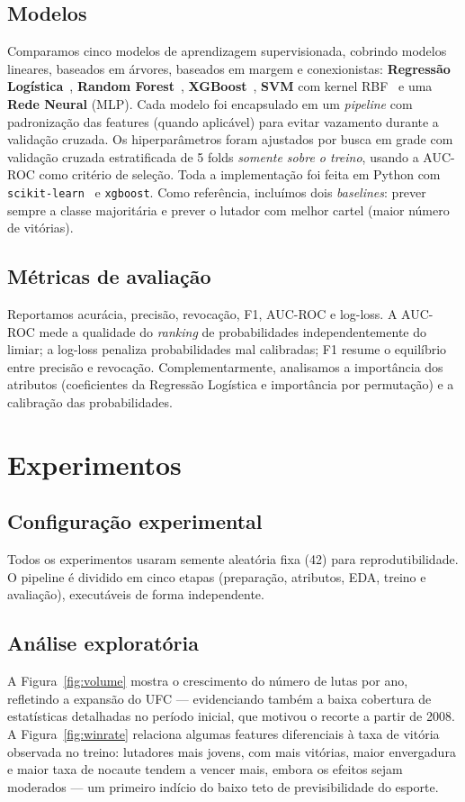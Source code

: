 \documentclass[10pt]{article}
\begin{document}
\subsection{Modelos}
Comparamos cinco modelos de aprendizagem supervisionada, cobrindo modelos
lineares, baseados em árvores, baseados em margem e conexionistas:
\textbf{Regressão Logística}~\cite{hastie2009elements},
\textbf{Random Forest}~\cite{breiman2001random},
\textbf{XGBoost}~\cite{chen2016xgboost},
\textbf{SVM} com kernel RBF~\cite{cortes1995svm} e uma
\textbf{Rede Neural} (MLP). Cada modelo foi encapsulado em um \emph{pipeline}
com padronização das features (quando aplicável) para evitar vazamento durante a
validação cruzada. Os hiperparâmetros foram ajustados por busca em grade com
validação cruzada estratificada de 5 folds \emph{somente sobre o treino},
usando a AUC-ROC como critério de seleção. Toda a implementação foi feita em
Python com \texttt{scikit-learn}~\cite{scikit-learn} e \texttt{xgboost}.
Como referência, incluímos dois \emph{baselines}: prever sempre a classe
majoritária e prever o lutador com melhor cartel (maior número de vitórias).

\subsection{Métricas de avaliação}
Reportamos acurácia, precisão, revocação, F1, AUC-ROC e log-loss. A AUC-ROC
mede a qualidade do \emph{ranking} de probabilidades independentemente do
limiar; a log-loss penaliza probabilidades mal calibradas; F1 resume o
equilíbrio entre precisão e revocação. Complementarmente, analisamos a
importância dos atributos (coeficientes da Regressão Logística e importância por
permutação) e a calibração das probabilidades.

\section{Experimentos}

\subsection{Configuração experimental}
Todos os experimentos usaram semente aleatória fixa (42) para reprodutibilidade.
O pipeline é dividido em cinco etapas (preparação, atributos, EDA, treino e
avaliação), executáveis de forma independente.

\subsection{Análise exploratória}
A Figura~\ref{fig:volume} mostra o crescimento do número de lutas por ano,
refletindo a expansão do UFC --- evidenciando também a baixa cobertura de
estatísticas detalhadas no período inicial, que motivou o recorte a partir de
2008. A Figura~\ref{fig:winrate} relaciona algumas features diferenciais à taxa
de vitória observada no treino: lutadores mais jovens, com mais vitórias, maior
envergadura e maior taxa de nocaute tendem a vencer mais, embora os efeitos
sejam moderados --- um primeiro indício do baixo teto de previsibilidade do
esporte.
\end{document}

